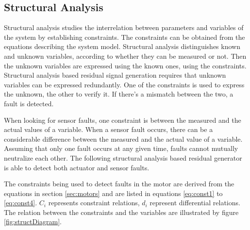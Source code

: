 \subsection{Structural Analysis}

\label{sec:structural}

Structural analysis studies the interrelation between parameters and variables of the system by establishing constraints. The constraints can be obtained from the equations describing the system model. Structural analysis distinguishes known and unknown variables, according to whether they can be measured or not. Then the unknown variables are expressed using the known ones, using the constraints. Structural analysis based residual signal generation requires that unknown variables can be expressed redundantly. One of the constraints is used to express the unknown, the other to verify it. If there's a mismatch between the two, a fault is detected.

When looking for sensor faults, one constraint is between the measured and the actual values of a variable. When a sensor fault occurs, there can be a considerable difference between the measured and the actual value of a variable. Assuming that only one fault occurs at any given time, faults cannot mutually neutralize each other. The following structural analysis based residual generator is able to detect both actuator and sensor faults.

The constraints being used to detect faults in the motor are derived from the equations in section \ref{sec:motors} and are listed in equations \ref{eq:const1} to \ref{eq:const4}. $C_i$ represents constraint relations, $d_i$ represent differential relations. The relation between the constraints and the variables are illustrated by figure \ref{fig:structDiagram}.



%

%

